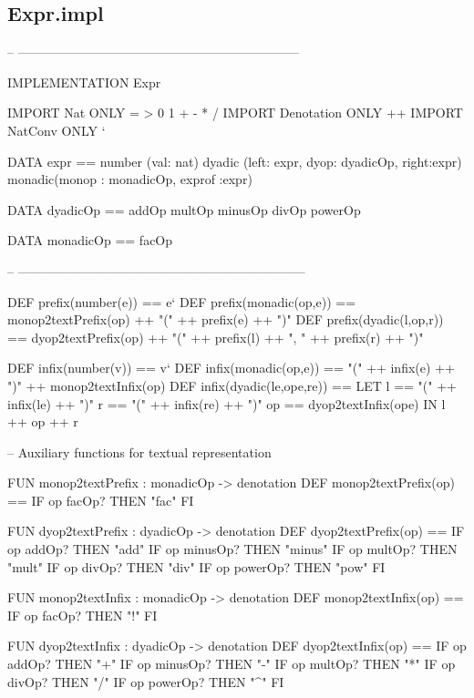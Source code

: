 \subsection{Expr.impl}
\begin{prog}
-- ------------------------------------------------------------------
 
IMPLEMENTATION Expr

IMPORT Nat ONLY = > 0 1 + - * / 
IMPORT Denotation  ONLY ++ 
IMPORT NatConv ONLY `

DATA  expr ==   number (val: nat)
                dyadic (left: expr, dyop: dyadicOp, right:expr)
                monadic(monop : monadicOp, exprof :expr)

DATA dyadicOp == addOp multOp minusOp divOp powerOp

DATA monadicOp == facOp

-- --------------------------------------------------------------------

DEF prefix(number(e)) == e`
DEF prefix(monadic(op,e)) ==  monop2textPrefix(op) ++
                                "(" ++ prefix(e) ++ ")"
DEF prefix(dyadic(l,op,r)) == dyop2textPrefix(op) ++
                              "(" ++ prefix(l) ++ ", " ++ 
                              prefix(r) ++ ")"

DEF infix(number(v)) == v`
DEF infix(monadic(op,e)) == "(" ++ infix(e) ++ ")" 
                               ++ monop2textInfix(op)
DEF infix(dyadic(le,ope,re)) == 
                LET l ==  "(" ++ infix(le) ++ ")"
                    r ==  "(" ++ infix(re) ++ ")"
                    op == dyop2textInfix(ope)
                IN l ++ op ++ r

-- Auxiliary functions for textual representation

FUN monop2textPrefix : monadicOp -> denotation
DEF monop2textPrefix(op) ==
        IF op facOp? THEN "fac"
        FI

FUN dyop2textPrefix : dyadicOp -> denotation
DEF dyop2textPrefix(op) ==
        IF op addOp? THEN "add"
        IF op minusOp? THEN "minus"
        IF op multOp? THEN "mult"
        IF op divOp? THEN "div"
        IF op powerOp? THEN "pow"
        FI


FUN monop2textInfix : monadicOp -> denotation
DEF monop2textInfix(op) ==
        IF op facOp? THEN "!"
        FI


FUN dyop2textInfix : dyadicOp -> denotation
DEF dyop2textInfix(op) ==
        IF op addOp? THEN "+"
        IF op minusOp? THEN "-"
        IF op multOp? THEN "*"
        IF op divOp? THEN "/"
        IF op powerOp? THEN "^"
        FI


\end{prog}

